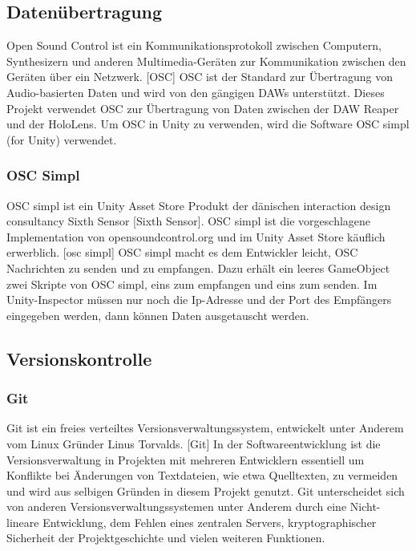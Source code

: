 \documentclass[11pt, titlepage, fleqn]{report}
\begin{document}
            \subsection{Datenübertragung}
            \label{sec:2.3.3Daten}
                Open Sound Control ist ein Kommunikationsprotokoll zwischen Computern, Synthesizern und anderen Multimedia-Geräten zur Kommunikation 
                zwischen den Geräten über ein Netzwerk. [OSC]\newline
                OSC ist der Standard zur Übertragung von Audio-basierten Daten und wird von den gängigen DAWs unterstützt. 
                Dieses Projekt verwendet OSC zur Übertragung von Daten zwischen der DAW Reaper und der HoloLens. Um OSC in Unity zu verwenden, 
                wird die Software OSC simpl (for Unity) verwendet.
                \subsubsection{OSC Simpl}
                OSC simpl ist ein Unity Asset Store Produkt der dänischen interaction design consultancy Sixth Sensor [Sixth Sensor]. 
                OSC simpl ist die vorgeschlagene Implementation von opensoundcontrol.org und im Unity Asset Store käuflich erwerblich. [osc simpl]
                OSC simpl macht es dem Entwickler leicht, OSC Nachrichten zu senden und zu empfangen. Dazu erhält ein leeres GameObject zwei Skripte 
                von OSC simpl, eins zum empfangen und eins zum senden. Im Unity-Inspector müssen nur noch die Ip-Adresse und der Port des 
                Empfängers eingegeben werden, dann können Daten ausgetauscht werden. 
                    
            \subsection{Versionskontrolle}
            \label{sec:2.3.4Kontrolle}
                \subsubsection{Git}
                    Git ist ein freies verteiltes Versionsverwaltungssystem, entwickelt unter Anderem vom Linux Gründer Linus Torvalds. [Git]
                    In der Softwareentwicklung ist die Versionsverwaltung in Projekten mit mehreren Entwicklern essentiell um Konflikte bei Änderungen 
                    von Textdateien, wie etwa Quelltexten, zu vermeiden und wird aus selbigen Gründen in diesem Projekt genutzt.
                    Git unterscheidet sich von anderen Versionsverwaltungssystemen unter Anderem durch eine Nicht-lineare Entwicklung, dem Fehlen eines 
                    zentralen Servers, kryptographischer Sicherheit der Projektgeschichte und vielen weiteren Funktionen.
\end{document}

